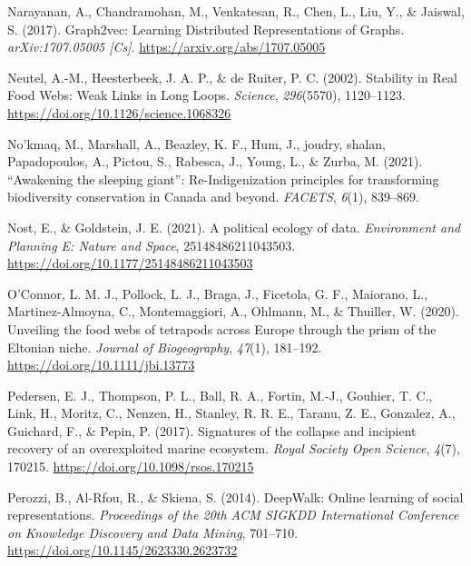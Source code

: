 \documentclass[10pt,oneside]{article}
\newlength{\cslhangindent}
\newenvironment{CSLReferences}[2] %
 {%
  \setlength{\parindent}{0pt}
  \ifodd #1 \everypar{\setlength{\hangindent}{\cslhangindent}}\ignorespaces\fi
  \ifnum #2 > 0
  \setlength{\parskip}{#2\baselineskip}
  \fi
 }%
 {}
\begin{document}
\begin{CSLReferences}{1}{0}
\leavevmode{}%
Narayanan, A., Chandramohan, M., Venkatesan, R., Chen, L., Liu, Y., \&
Jaiswal, S. (2017). Graph2vec: Learning Distributed Representations of
Graphs. \emph{arXiv:1707.05005 {[}Cs{]}}.
\url{https://arxiv.org/abs/1707.05005}

\leavevmode{}%
Neutel, A.-M., Heesterbeek, J. A. P., \& de Ruiter, P. C. (2002).
Stability in Real Food Webs: Weak Links in Long Loops. \emph{Science},
\emph{296}(5570), 1120--1123.
\url{https://doi.org/10.1126/science.1068326}

\leavevmode{}%
No'kmaq, M., Marshall, A., Beazley, K. F., Hum, J., joudry, shalan,
Papadopoulos, A., Pictou, S., Rabesca, J., Young, L., \& Zurba, M.
(2021). {``Awakening the sleeping giant''}: Re-Indigenization principles
for transforming biodiversity conservation in Canada and beyond.
\emph{FACETS}, \emph{6}(1), 839--869.

\leavevmode{}%
Nost, E., \& Goldstein, J. E. (2021). A political ecology of data.
\emph{Environment and Planning E: Nature and Space}, 25148486211043503.
\url{https://doi.org/10.1177/25148486211043503}

\leavevmode{}%
O'Connor, L. M. J., Pollock, L. J., Braga, J., Ficetola, G. F.,
Maiorano, L., Martinez-Almoyna, C., Montemaggiori, A., Ohlmann, M., \&
Thuiller, W. (2020). Unveiling the food webs of tetrapods across Europe
through the prism of the Eltonian niche. \emph{Journal of Biogeography},
\emph{47}(1), 181--192. \url{https://doi.org/10.1111/jbi.13773}

\leavevmode{}%
Pedersen, E. J., Thompson, P. L., Ball, R. A., Fortin, M.-J., Gouhier,
T. C., Link, H., Moritz, C., Nenzen, H., Stanley, R. R. E., Taranu, Z.
E., Gonzalez, A., Guichard, F., \& Pepin, P. (2017). Signatures of the
collapse and incipient recovery of an overexploited marine ecosystem.
\emph{Royal Society Open Science}, \emph{4}(7), 170215.
\url{https://doi.org/10.1098/rsos.170215}

\leavevmode{}%
Perozzi, B., Al-Rfou, R., \& Skiena, S. (2014). DeepWalk: Online
learning of social representations. \emph{Proceedings of the 20th ACM
SIGKDD International Conference on Knowledge Discovery and Data Mining},
701--710. \url{https://doi.org/10.1145/2623330.2623732}


\end{CSLReferences}
\end{document}
